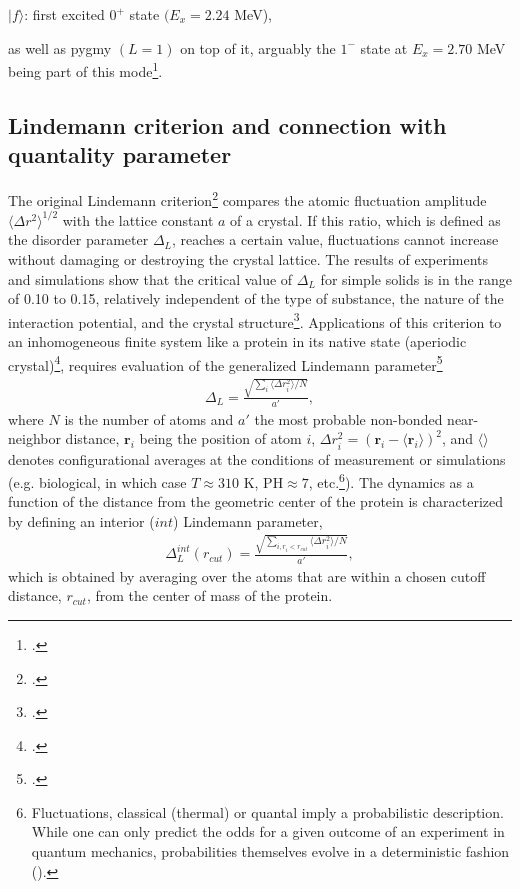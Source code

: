\centerline{$|f\rangle$: first excited $0^+$ state $(E_x=2.24$ MeV),}
\vspace{0.2cm}
as well as pygmy $(L=1)$ on top of it, arguably the $1^-$ state at $E_x=2.70$ MeV being part of this mode\footnote{\cite{Iwasaki:00}.}.
  \begin{subappendices}
\section[Lindemann criterion and  quantality parameter]{Lindemann criterion and connection with quantality parameter}\label{C2AppC}
The original Lindemann criterion\footnote{\cite{Lindemann:10}.} compares the atomic fluctuation amplitude $\langle\Delta r^2\rangle^{1/2}$ with the lattice constant $a$ of a crystal. If this ratio, which is defined as the disorder parameter $\Delta_L$, reaches a certain value, fluctuations cannot increase without damaging or destroying the crystal lattice. The results of experiments and simulations show that the critical value of $\Delta_L$ for simple solids is in the range of 0.10 to 0.15, relatively independent of the type of substance, the nature of the interaction potential, and the crystal structure\footnote{\cite{Bilgram:87,Lowen:94,Stillinger:95}.}. Applications of this criterion to an inhomogeneous finite system like a protein in its native state (aperiodic crystal)\footnote{\cite{Schrodinger:44}.}, requires evaluation of the generalized Lindemann parameter\footnote{\cite{Stillinger:90}.}
\begin{align}
\Delta_L=\frac{\sqrt{\sum_i\langle \Delta r_i^2\rangle/N}}{a'},
\end{align}  
where $N$ is the number of atoms and $a'$ the most probable non-bonded near-neighbor distance, $\mathbf r_i$ being the position of atom $i$, $\Delta r_i^2=(\mathbf r_i-\langle \mathbf r_i\rangle)^2$, and $\langle\rangle$ denotes configurational averages at the conditions of measurement or simulations (e.g. biological, in which case $T\approx 310$ K, PH$\approx 7$, etc.\footnote{Fluctuations, classical (thermal) or quantal imply a probabilistic description. While one can only predict the odds for a given outcome of an experiment in quantum mechanics, probabilities themselves evolve in a deterministic fashion  (\cite{Born:48}).}). The dynamics as a function of the distance from the geometric center of the protein is characterized by defining an interior ($int$) Lindemann parameter, 
\begin{align}
\Delta^{int}_L(r_{cut})=\frac{\sqrt{\sum_{i,r_i<r_{cut}}\langle \Delta r_i^2\rangle/N}}{a'},
\end{align}  
which is obtained by averaging over the atoms that are within a chosen cutoff distance, $r_{cut}$, from the center of mass of the protein.


\end{subappendices}
